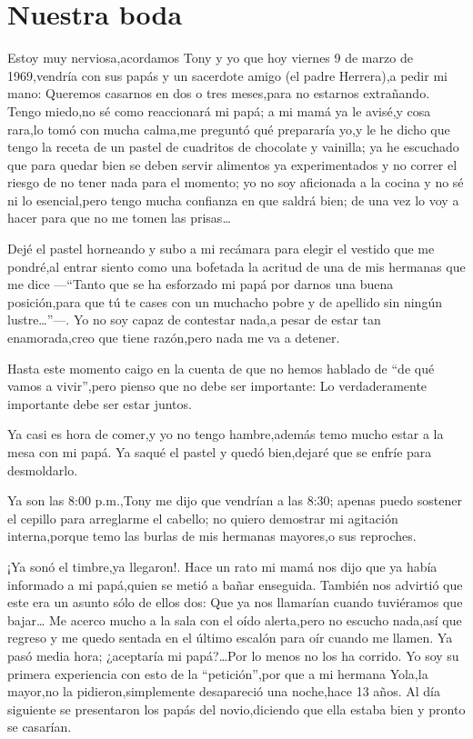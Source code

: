 \documentclass[letterpaper,12pt]{book}
\begin{document}
\chapter{Nuestra boda}
Estoy muy nerviosa,acordamos Tony y yo que hoy viernes 9 de  marzo de 1969,vendría con sus papás y un sacerdote amigo (el padre Herrera),a pedir mi mano: Queremos casarnos en dos o tres meses,para no estarnos extrañando.  Tengo miedo,no sé como reaccionará mi papá; a mi mamá ya le avisé,y cosa rara,lo tomó con mucha calma,me preguntó qué prepararía yo,y le he dicho que tengo la receta de un pastel de cuadritos de chocolate y vainilla; ya he escuchado que para quedar bien se deben servir alimentos ya experimentados y no correr el riesgo de no tener nada para el momento; yo no soy aficionada a la cocina y no sé ni lo esencial,pero tengo mucha confianza en que saldrá bien; de una vez lo voy a hacer para que no me tomen las prisas\ldots

Dejé el pastel horneando y subo a mi recámara para elegir el vestido que me pondré,al entrar siento como una bofetada la acritud de una de mis hermanas que me dice ---``Tanto que se ha esforzado mi papá por darnos una buena posición,para que tú te cases con un muchacho pobre y de apellido sin ningún lustre\ldots''---. Yo no soy capaz de contestar nada,a pesar de estar tan enamorada,creo que tiene razón,pero nada me va a detener. 
 
Hasta este momento caigo en la cuenta de que no hemos hablado de ``de qué vamos a vivir'',pero pienso que no debe ser importante: Lo verdaderamente importante debe ser estar juntos.

Ya casi es hora de comer,y yo no tengo hambre,además temo mucho estar a la mesa con mi papá. Ya saqué el pastel y quedó bien,dejaré que se enfríe para desmoldarlo.

Ya son las 8:00 p.m.,Tony me dijo que vendrían a las 8:30; apenas puedo sostener el cepillo para arreglarme el cabello; no quiero demostrar mi agitación interna,porque temo las burlas de mis hermanas mayores,o sus reproches.

¡Ya sonó el timbre,ya llegaron!. Hace un rato mi mamá nos dijo que ya había informado a mi papá,quien se metió a bañar enseguida. También nos advirtió que este era un asunto sólo de ellos dos: Que ya nos llamarían cuando tuviéramos que bajar\ldots
Me acerco mucho a la sala con el oído alerta,pero no escucho nada,así que regreso y me quedo sentada en el último escalón para oír cuando me llamen. Ya pasó media hora; ¿aceptaría mi papá?\ldots Por lo menos no los ha corrido. Yo soy su primera experiencia con esto de la ``petición'',por que a mi hermana Yola,la mayor,no la pidieron,simplemente desapareció una noche,hace 13 años.  Al día siguiente se presentaron los papás del novio,diciendo que ella estaba bien y pronto se casarían.
\end{document}
